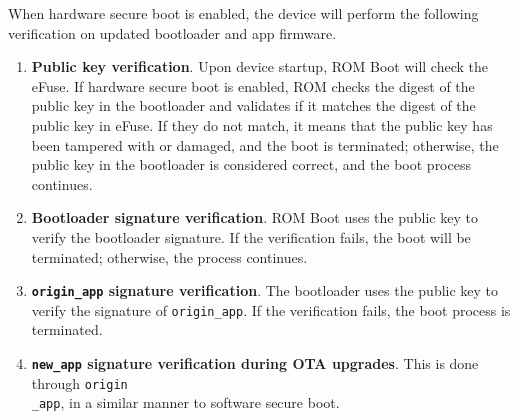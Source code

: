 \documentclass[a4paper,12pt]{book}
\begin{document}

When hardware secure boot is enabled, the device will perform the following verification on updated bootloader and app firmware.

\begin{enumerate}[label=(\arabic*)]
    \item \textbf{Public key verification}. Upon device startup, ROM Boot will check the eFuse. If hardware secure boot is enabled, ROM checks the digest of the public key in the bootloader and validates if it matches the digest of the public key in eFuse. If they do not match, it means that the public key has been tampered with or damaged, and the boot is terminated; otherwise, the public key in the bootloader is considered correct, and the boot process continues.
    \item \textbf{Bootloader signature verification}. ROM Boot uses the public key to verify the bootloader signature. If the verification fails, the boot will be terminated; otherwise, the process continues.
    \item \textbf{\texttt{origin\_app} signature verification}. The bootloader uses the public key to verify the signature of \verb|origin_app|. If the verification fails, the boot process is terminated.
    \item \textbf{\texttt{new\_app} signature verification during OTA upgrades}. This is done through \verb|origin|\\ \verb|_app|, in a similar manner to software secure boot.
\end{enumerate}
\end{document}
